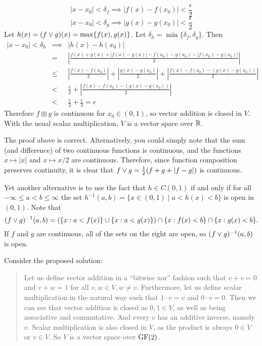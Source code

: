 $$ |x - x_0| < \delta_f \implies |f(x)-f(x_0)| < \frac{\epsilon}{2}$$ $$|x - x_0| < \delta_g \implies |g(x)-g(x_0)| < \frac{\epsilon}{2}$$
Let $h(x) = (f\vee g)(x) = \max\{f(x),g(x)\}$. Let $\delta_h = \min\{\delta_f,\delta_g\}$. Then
\begin{eqnarray*}
|x - x_0| < \delta_h & \implies & |h(x) - h(x_0)| \\ & = & \left|\frac{f(x)+g(x)+|f(x)-g(x)|-f(x_0)-g(x_0)-|f(x_0)-g(x_0)|}{2}\right| \\
& \leq & \left|\frac{f(x)-f(x_0)}{2}\right| + \left|\frac{g(x)-g(x_0)}{2}\right|
+ \left|\frac{f(x)-f(x_0)-(g(x)-g(x_0))}{2}\right| \\
& < & \frac{\epsilon}{2} + \left|\frac{f(x)-f(x_0)-(g(x)-g(x_0))}{2}\right| \\
& < & \frac{\epsilon}{2} + \frac{\epsilon}{2} = \epsilon
\end{eqnarray*}
Therefore $f \boxplus g$ is continuous for $x_0 \in (0,1)$, so vector addition is closed in $V$. With the usual scalar multiplication, $V$ is a vector space over $\mathbb{R}$.

\bigskip

 The proof above is correct.  Alternatively, you could simply note that
the sum (and difference) of two continuous functions is continuous, and the
functions  $x \mapsto |x|$ and $x \mapsto x/2$ are continuous.  Therefore, since
function composition preserves continuity, it is clear that
$f \vee g = \frac{1}{2}(f+g+|f-g|)$ is continuous. 

Yet another alternative is to use the fact that
$h \in C(0,1)$ if and only if for all $-\infty\leq a < b \leq \infty$ the set
$h^{-1}(a, b) = \{x \in (0,1) \mid a< h(x) < b\}$ is open in $(0,1)$.
Note that
\[
(f\vee g)^{-1}(a, b) =
\left(\{x : a< f(x)\}\cup \{x : a< g(x)\}\right) \cap
\{x : f(x)< b\} \cap \{x : g(x)<b\}.
\]
If $f$ and $g$ are continuous, all of the sets on the right are open, so
$(f\vee g)^{-1}(a, b)$ is open.

\probskip

Consider the proposed solution:
\begin{quote}
Let us define vector addition in a ``bitwise xor'' fashion such that $v + v = 0$
and $v + w = 1$ for all $v,w \in V, w \neq v$. Furthermore, let us define scalar
multiplication in the natural way such that $1\cdot v = v$ and $0\cdot v = 0$.
Then we can see that vector addition is closed as $0,1 \in V$, as well as being
associative and commutative. And every $v$ has an additive inverse, namely
$v$. Scalar multiplication is also closed in $V$, as the product is always $0
\in V$ or $v \in V$. So $V$ is a vector space over $\operatorname{GF}(2)$.  
\end{quote}

